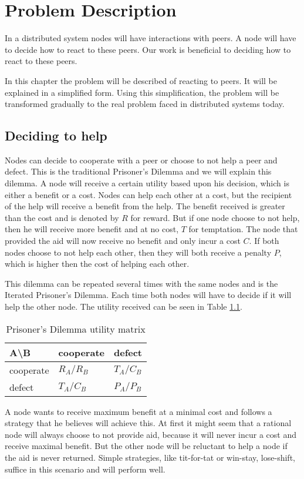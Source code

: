 \chapter{Problem Description}
In a distributed system nodes will have interactions with peers.
A node will have to decide how to react to these peers.
Our work is beneficial to deciding how to react to these peers.

In this chapter the problem will be described of reacting to peers.
It will be explained in a simplified form.
Using this simplification, the problem will be transformed gradually
to the real problem faced in distributed systems today.

\section{Deciding to help}
Nodes can decide to cooperate with a peer or choose to not help a peer and defect.
This is the traditional Prisoner's Dilemma 
and we will explain this dilemma\cite{Nowak-PrisonerDilemma}\cite{Lai-Incentives}.
A node will receive a certain utility based upon his decision, which is either a benefit or a cost.
Nodes can help each other at a cost, but the recipient of the help will receive a benefit from the help.
The benefit received is greater than the cost and is denoted by $R$ for reward.
But if one node choose to not help, then he will receive more benefit and at no cost, $T$ for temptation.
The node that provided the aid will now receive no benefit and only incur a cost $C$.
If both nodes choose to not help each other, 
then they will both receive a penalty $P$, which is higher then the cost of helping each other.

This dilemma can be repeated several times with the same nodes and is the Iterated Prisoner's Dilemma.
Each time both nodes will have to decide if it will help the other node.
The utility received can be seen in Table \ref{tab:pd-um}.

\begin{table}[h]
\center
	\begin{tabular}{l|ll}
	A\textbackslash B       & cooperate  & defect     \\ \hline
	cooperate & $R_A /R_B$ & $T_A /C_B$ \\
	defect    & $T_A /C_B$ & $P_A /P_B$
	\end{tabular}
\caption{Prisoner's Dilemma utility matrix}
\label{tab:pd-um}
\end{table}

A node wants to receive maximum benefit at a minimal cost
and follows a strategy that he believes will achieve this.
At first it might seem that a rational node will always choose to not provide aid,
because it will never incur a cost and receive maximal benefit.
But the other node will be reluctant to help a node if the aid is never returned.
Simple strategies, like tit-for-tat or win-stay, lose-shift, suffice in this scenario
and will perform well\cite{Nowak-Cooperation}.

